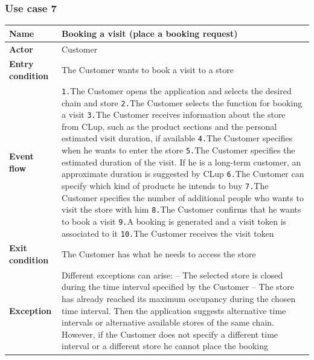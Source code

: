 \documentclass[a4paper,oneside,11pt]{book}   %
\begin{document}
    \subsubsection{Use case 7}
    \begin{longtable}[c] { |>{\bfseries{}}C{0.25\textwidth}|H{0.55\textwidth}| }
        \hline
        Name            & Booking a visit (place a booking request) \\ \hline
        Actor           & Customer \\ \hline
        Entry condition & The Customer wants to book a visit to a store \\ \hline
        Event flow      & 
        \texttt{1.}The Customer opens the application and selects the desired chain and store \newline
        \texttt{2.}The Customer selects the function for booking a visit \newline
        \texttt{3.}The Customer receives information about the store from CLup, such as the product sections and the personal estimated visit duration, if available \newline
        \texttt{4.}The Customer specifies when he wants to enter the store \newline
        \texttt{5.}The Customer specifies the estimated duration of the visit. If he is a long-term customer, an approximate duration is suggested by CLup \newline
        \texttt{6.}The Customer can specify which kind of products he intends to buy \newline
        \texttt{7.}The Customer specifies the number of additional people who wants to visit the store with him  \newline
        \texttt{8.}The Customer confirms that he wants to book a visit \newline
        \texttt{9.}A booking is generated and a visit token is associated to it \newline
        \texttt{10.}The Customer receives the visit token \\ \hline
        Exit condition  & The Customer has what he needs to access the store \\ \hline
        Exception       & Different exceptions can arise: \newline
        -- The selected store is closed during the time interval specified by the Customer \newline
        -- The store has already reached its maximum occupancy during the chosen time interval. Then the application suggests alternative time intervals or alternative available stores of the same chain. However, if the Customer does not specify a different time interval or a different store he cannot place the booking \newline

\end{longtable}
\end{document}
